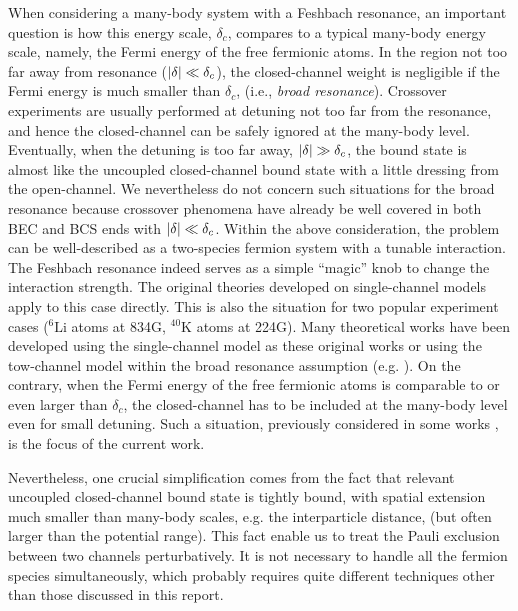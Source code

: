 \documentclass[reprint,pra]{revtex4-1}
\begin{document}
  When considering a many-body system with a Feshbach resonance, an important question is how this energy scale, $\delta_c$, compares to a typical many-body energy scale, namely, the Fermi energy of the free fermionic atoms. In the region not too far away from resonance ($\left\lvert{\delta}\right\rvert\ll\delta_{c}$), the closed-channel weight is negligible if the Fermi energy is much smaller than $\delta_c$, (i.e., \emph{broad resonance}).  Crossover experiments are usually performed at detuning not too far from the resonance, and hence the closed-channel can be safely ignored at the many-body level. Eventually, when the detuning is too far away, $\left\lvert{\delta}\right\rvert\gg\delta_{c}$, the bound state is almost like the    uncoupled closed-channel bound state with a little dressing from the open-channel.  We nevertheless do not concern such situations for the broad resonance because crossover phenomena have already be well covered in both BEC and BCS ends with $\left\lvert{\delta}\right\rvert\ll\delta_{c}$. Within the above consideration, the problem can be well-described as a two-species fermion system with a tunable interaction.  The Feshbach resonance indeed serves as a simple ``magic'' knob to change the interaction strength.  The original  theories developed on  single-channel models  apply to this case directly.  This is also the situation for two  popular experiment cases (${}^{6}\text{Li}$ atoms at 834G, $^{40}\text{K}$ atoms at 224G).   Many theoretical works have been developed using the single-channel model as these original works or using the tow-channel model within the broad resonance assumption (e.g. \cite{Holland01,HoUniversal,Fuchs04}). On the contrary, when the Fermi energy of the free fermionic atoms is  comparable to or even larger than $\delta_c$, the closed-channel has to be included at the many-body level even for small detuning. Such a situation, previously considered in some works \cite{GurarieNarrow}, is the focus of the current work.
  
  Nevertheless, one crucial simplification comes from  the fact  that relevant uncoupled closed-channel bound state is  tightly bound, with spatial extension much smaller than  many-body scales, e.g. the interparticle distance, (but often larger than the potential range).  This fact enable us to treat the Pauli exclusion between two channels perturbatively. It is not necessary to handle all the  fermion species simultaneously, which probably requires quite different techniques  other than those discussed in this report. 
\end{document}
